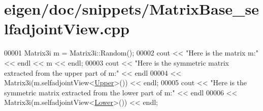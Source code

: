 \hypertarget{eigen_2doc_2snippets_2_matrix_base__selfadjoint_view_8cpp_source}{}\section{eigen/doc/snippets/\+Matrix\+Base\+\_\+selfadjoint\+View.cpp}
\label{eigen_2doc_2snippets_2_matrix_base__selfadjoint_view_8cpp_source}

\begin{DoxyCode}
00001 Matrix3i m = Matrix3i::Random();
00002 cout << \textcolor{stringliteral}{"Here is the matrix m:"} << endl << m << endl;
00003 cout << \textcolor{stringliteral}{"Here is the symmetric matrix extracted from the upper part of m:"} << endl
00004      << Matrix3i(m.selfadjointView<\hyperlink{group__enums_gga39e3366ff5554d731e7dc8bb642f83cda6bcb58be3b8b8ec84859ce0c5ac0aaec}{Upper}>()) << endl;
00005 cout << \textcolor{stringliteral}{"Here is the symmetric matrix extracted from the lower part of m:"} << endl
00006      << Matrix3i(m.selfadjointView<\hyperlink{group__enums_gga39e3366ff5554d731e7dc8bb642f83cda891792b8ed394f7607ab16dd716f60e6}{Lower}>()) << endl;
\end{DoxyCode}

